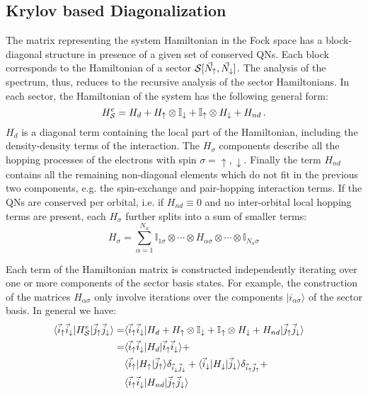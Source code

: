 \documentclass[final,3p,10pt]{elsarticle}
\newcommand{\ket}[1]
{|#1\rangle}
\newcommand{\bra}[1]
{\langle #1|}
\def\a{\alpha}       \def\b{\beta}   \def\g{\gamma}   \def\d{\delta}
\def\=={\equiv}
\def\up{\uparrow} \def\down{\downarrow} \def\dw{\downarrow}
\def\=={\equiv}
\begin{document}
\subsection{Krylov based Diagonalization}\label{sSecHam}
The matrix representing the system Hamiltonian in the Fock space has a
block-diagonal structure in presence of a given set of conserved QNs.
Each block corresponds to the Hamiltonian of a sector
$\SS[\vec{N}_\up,\vec{N}_\dw]$. The analysis of the spectrum, thus,
reduces to the recursive analysis of the sector Hamiltonians. 
In each sector, the Hamiltonian of the system has the following general form: 
\begin{equation}
H^e_\SS = H_d  + H_\up\otimes \mathbb{I}_\dw + \mathbb{I}_\up\otimes
H_\dw + H_{nd}\,.
\label{Hdecomp}
\end{equation}
$H_d$ is a diagonal term containing the local part of the Hamiltonian,
including the density-density terms of the interaction.
The $H_\sigma$ components describe all the hopping processes of the
electrons with spin $\sigma=\up,\dw$.
Finally the term $H_{nd}$ contains all the remaining non-diagonal
elements which do not fit in the previous two components,
e.g. the spin-exchange and pair-hopping interaction terms.
If the QNs are conserved per orbital, i.e. if $H_{nd}\==0$ and no
inter-orbital local hopping terms are present,  each $H_\sigma$
further splits into a sum of smaller terms:
$$
H_\sigma = \sum_{\a=1}^{N_\alpha}\mathbb{I}_{1\sigma}\otimes\cdots\otimes
H_{\a\sigma}\otimes\cdots\otimes \mathbb{I}_{N_\alpha\sigma}
$$


Each term of the  Hamiltonian matrix is constructed  independently 
iterating over one or more  components of the sector basis states.
For example, the construction of the matrices $H_{\a\sigma}$ only involve iterations over the components
$\ket{i_{\a\sigma}}$ of the sector basis. In general we have:
\begin{equation}
\begin{split}
  \bra{\vec{i}_\up\vec{i}_\dw}H^e_\SS\ket{\vec{j}_\up\vec{j}_\dw}
  =&
  \bra{\vec{i}_\up\vec{i}_\dw}
  H_d + H_\up\otimes \mathbb{I}_\dw + \mathbb{I}_\up\otimes H_\dw + H_{nd}
  \ket{\vec{j}_\up\vec{j}_\dw}\cr
  =&
  \bra{\vec{i}_\up\vec{i}_\dw}H_d\ket{\vec{i}_\up\vec{i}_\dw} +\cr
  &\bra{\vec{i}_\up}H_\up\ket{\vec{j}_\up}\delta_{\vec{i}_\dw\vec{j}_\dw}
  +
  \bra{\vec{i}_\dw}H_\dw\ket{\vec{j}_\dw}\delta_{\vec{i}_\up\vec{j}_\up} + \cr
  &\bra{\vec{i}_\up\vec{i}_\dw}H_{nd}\ket{\vec{j}_\up\vec{j}_\dw} 
\end{split}
\label{Hbuild}
\end{equation}
\end{document}
